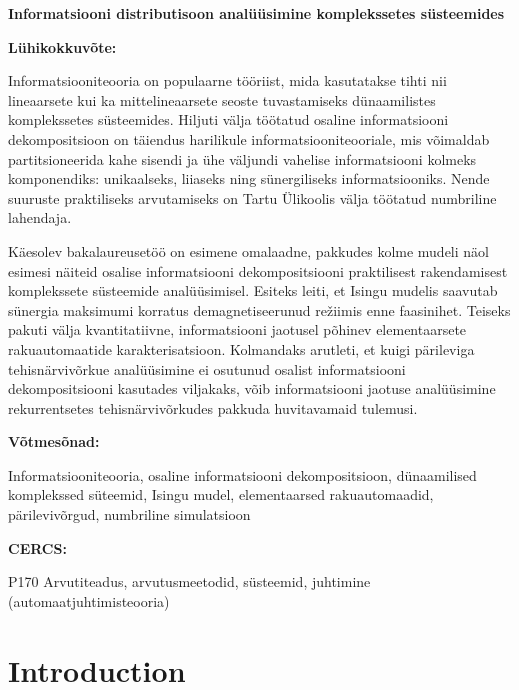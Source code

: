 \documentclass[12pt]{article}
\begin{document}
\noindent\textbf{\large Informatsiooni distributisoon analüüsimine komplekssetes süsteemides}

\vspace*{3ex}


\noindent\textbf{Lühikokkuvõte:} 

\noindent
Informatsiooniteooria on populaarne tööriist, mida kasutatakse tihti nii lineaarsete kui ka mittelineaarsete seoste tuvastamiseks dünaamilistes komplekssetes süsteemides. Hiljuti välja töötatud osaline informatsiooni dekompositsioon on täiendus harilikule informatsiooniteooriale, mis võimaldab partitsioneerida kahe sisendi ja ühe väljundi vahelise informatsiooni kolmeks komponendiks: unikaalseks, liiaseks ning sünergiliseks informatsiooniks. Nende suuruste praktiliseks arvutamiseks on Tartu Ülikoolis välja töötatud numbriline lahendaja. 

Käesolev bakalaureusetöö on esimene omalaadne, pakkudes kolme mudeli näol esimesi näiteid osalise informatsiooni dekompositsiooni praktilisest rakendamisest komplekssete süsteemide analüüsimisel. Esiteks leiti, et Isingu mudelis saavutab sünergia maksimumi korratus demagnetiseerunud režiimis enne faasinihet. Teiseks pakuti välja kvantitatiivne, informatsiooni jaotusel põhinev elementaarsete rakuautomaatide karakterisatsioon. Kolmandaks arutleti, et kuigi pärileviga tehisnärvivõrkue analüüsimine ei osutunud osalist informatsiooni dekompositsiooni kasutades viljakaks, võib informatsiooni jaotuse analüüsimine rekurrentsetes tehisnärvivõrkudes pakkuda huvitavamaid tulemusi.

\vspace*{1ex}

\noindent\textbf{Võtmesõnad:} 

Informatsiooniteooria, osaline informatsiooni dekompositsioon, dünaamilised komplekssed süteemid, 
Isingu mudel, elementaarsed rakuautomaadid, pärilevivõrgud, numbriline simulatsioon

\vspace*{1ex}

\noindent\textbf{CERCS:} 

P170 Arvutiteadus, arvutusmeetodid, süsteemid, juhtimine (automaatjuhtimisteooria)

\newpage
\tableofcontents

\newpage
\section*{Introduction}
\end{document}

